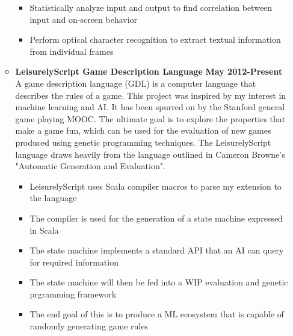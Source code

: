 \documentclass[overlapped]{res}
\begin{document}
\begin{resume}
\begin{itemize}[leftmargin=0in]
\begin{itemize}[leftmargin=0in]
\begin{samepage}
\begin{itemize}
                        \item[\textbullet] Statistically analyze input and output to find correlation between input and on-screen behavior
                        \item[\textbullet] Perform optical character recognition to extract textual information from individual frames
                    \end{itemize}
                \end{samepage}
            \item[] 
                \begin{samepage}
                    \textbf{LeisurelyScript Game Description Language} \hfill \textbf{May 2012-Present} \\
                    A game description language (GDL) is a computer language that describes the rules of a game. 
                    This project was inspired by my interest in machine learning and AI. It has been spurred on by the 
                    Stanford general game playing MOOC. The ultimate goal is to explore the properties that make a game
                    fun, which can be used for the evaluation of new games produced using genetic programming techniques. 
                    The LeisurelyScript language draws heavily from the language 
                    outlined in Cameron Browne's "Automatic Generation and Evaluation".
                    \begin{itemize}
                        \item[\textbullet] LeisurelyScript uses Scala compiler macros to parse my extension to the language 
                        \item[\textbullet] The compiler is used for the generation of a state machine expressed in Scala 
                        \item[\textbullet] The state machine implements a standard API that an AI can query for required information
                        \item[\textbullet] The state machine will then be fed into a WIP evaluation and genetic prgramming framework
                        \item[\textbullet] The end goal of this is to produce a ML ecosystem that is capable of randomly generating game rules

                    \end{itemize}
                \end{samepage}
\end{itemize}



\end{itemize}
\end{resume}
\end{document}
